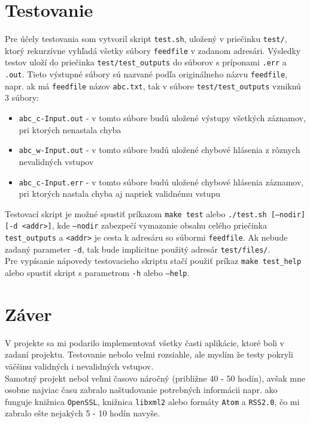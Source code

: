 \documentclass[a4paper, 11pt]{article}
\begin{document}
    \section{Testovanie}
    Pre účely testovania som vytvoril skript \texttt{test.sh}, uložený v priečinku \texttt{test/}, ktorý rekurzívne vyhľadá všetky súbory \texttt{feedfile} v zadanom adresári. Výsledky testov uloží do priečinka \texttt{test/test\_outputs} do súborov s príponami \texttt{.err} a \texttt{.out}. Tieto výstupné súbory sú nazvané podľa originálneho názvu \texttt{feedfile}, napr. ak má \texttt{feedfile} názov \texttt{abc.txt}, tak v súbore \texttt{test/test\_outputs} vzniknú 3 súbory:
    \begin{itemize}
        \item \texttt{abc\_c-Input.out} - v tomto súbore budú uložené výstupy všetkých záznamov, pri ktorých nenastala chyba
        \item \texttt{abc\_w-Input.out} - v tomto súbore budú uložené chybové hlásenia z rôznych nevalidných vstupov
        \item \texttt{abc\_c-Input.err} - v tomto súbore budú uložené chybové hlásenia záznamov, pri ktorých nastala chyba aj napriek validnému vstupu
    \end{itemize}
    
	Testovací skript je možné spustiť príkazom \texttt{make test} alebo \texttt{./test.sh [--nodir] [-d <addr>]}, kde \texttt{--nodir} zabezpečí vymazanie obsahu celého priečinka \texttt{test\_outputs} a \texttt{<addr>} je cesta k adresáru so súbormi \texttt{feedfile}. Ak nebude zadaný parameter \texttt{-d}, tak bude implicitne použitý adresár \texttt{test/files/}. \\ 
	
    Pre vypísanie nápovedy testovacieho skriptu stačí použiť príkaz \texttt{make test\_help} alebo spustiť skript s parametrom \texttt{-h} alebo \texttt{--help}.    

    \section{Záver}
    \label{endeSchluss}
    V projekte sa mi podarilo implementovať všetky časti aplikácie, ktoré boli v zadaní projektu. Testovanie nebolo veľmi rozsiahle, ale myslím že testy pokryli väčšinu validných i nevalidných vstupov. \\
    
     Samotný projekt nebol veľmi časovo náročný (približne 40 - 50 hodín), avšak mne osobne najviac času zabralo naštudovanie potrebných informácii napr. ako funguje knižnica \texttt{OpenSSL}, knižnica \texttt{libxml2} alebo formáty \texttt{Atom} a \texttt{RSS2.0}, čo mi zabralo ešte nejakých 5 - 10 hodín navyše. \\
\end{document}
